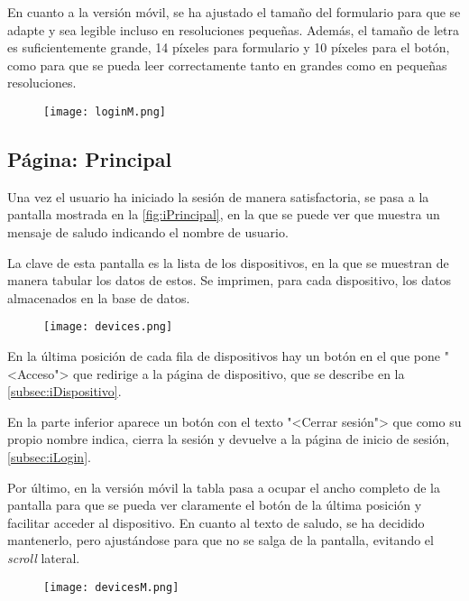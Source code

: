 En cuanto a la versión móvil, se ha ajustado el tamaño del formulario para que se adapte y sea legible incluso en resoluciones pequeñas. Además, el tamaño de letra es suficientemente grande, 14 píxeles para formulario y 10 píxeles para el botón, como para que se pueda leer correctamente tanto en grandes como en pequeñas resoluciones.
\begin{figure}[H]
	{\texttt{[image: loginM.png]}}
\end{figure}

\subsection{Página: Principal}\label{subsec:iPrincipal}
Una vez el usuario ha iniciado la sesión de manera satisfactoria, se pasa a la pantalla mostrada en la \autoref{fig:iPrincipal}, en la que se puede ver que muestra un mensaje de saludo indicando el nombre de usuario.

La clave de esta pantalla es la lista de los dispositivos, en la que se muestran de manera tabular los datos de estos. Se imprimen, para cada dispositivo, los datos almacenados en la base de datos.
\vspace{.5cm}
\begin{figure}[H]
	{\texttt{[image: devices.png]}}
\end{figure}
En la última posición de cada fila de dispositivos hay un botón en el que pone "<Acceso"> que redirige a la página de dispositivo, que se describe en la \autoref{subsec:iDispositivo}.

En la parte inferior aparece un botón con el texto "<Cerrar sesión"> que como su propio nombre indica, cierra la sesión y devuelve a la página de inicio de sesión, \autoref{subsec:iLogin}.

Por último, en la versión móvil la tabla pasa a ocupar el ancho completo de la pantalla para que se pueda ver claramente el botón de la última posición y facilitar acceder al dispositivo. En cuanto al texto de saludo, se ha decidido mantenerlo, pero ajustándose para que no se salga de la pantalla, evitando el \textit{scroll} lateral.
\vspace{.5cm}
\begin{figure}[H]
	{\texttt{[image: devicesM.png]}}
\end{figure}


